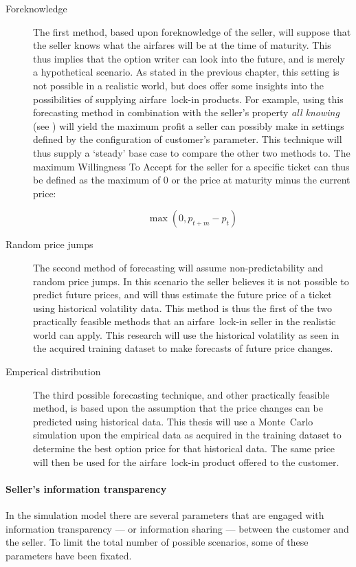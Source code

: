 \begin{description}
\item[Foreknowledge] The first method, based upon foreknowledge of the seller, will suppose that the seller knows what the airfares will be at the time of maturity. This thus implies that the option writer can look into the future, and is merely a hypothetical scenario. As stated in the previous chapter, this setting is not possible in a realistic world, but does offer some insights into the possibilities of supplying airfare~lock-in products. For example, using this forecasting method in combination with the seller's property \emph{all knowing} (see ) will yield the maximum profit a seller can possibly make in settings defined by the configuration of customer's parameter. This technique will thus supply a `steady' base case to compare the other two methods to. The maximum Willingness To Accept for the seller for a specific ticket can thus be defined as the maximum of 0 or the price at maturity minus the current price:

$$
\max(0, p_{t+m} - p_t)
$$


\item[Random price jumps] The second method of forecasting will assume non-predictability and random price jumps. In this scenario the seller believes it is not possible to predict future prices, and will thus estimate the future price of a ticket using historical volatility data. This method is thus the first of the two practically feasible methods that an airfare~lock-in seller in the realistic world can apply. This research will use the historical volatility as seen in the acquired training dataset to make forecasts of future price changes.

\item[Emperical distribution] The third possible forecasting technique, and other practically feasible method, is based upon the assumption that the price changes can be predicted using historical data. This thesis will use a Monte~Carlo simulation upon the empirical data as acquired in the training dataset to determine the best option price for that historical data. The same price will then be used for the airfare~lock-in product offered to the customer.
\end{description}

\paragraph{Seller's information transparency}
In the simulation model there are several parameters that are engaged with information transparency --- or information sharing --- between the customer and the seller. To limit the total number of possible scenarios, some of these parameters have been fixated.

